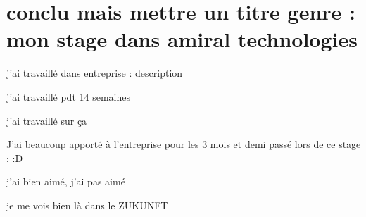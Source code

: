 \section{conclu mais mettre un titre genre : mon stage dans amiral technologies}

j'ai travaillé dans entreprise : description

j'ai travaillé pdt 14 semaines

j'ai travaillé sur ça

J'ai beaucoup apporté à l'entreprise pour les 3 mois et demi passé lors de ce stage : :D

j'ai bien aimé, j'ai pas aimé

je me vois bien là dans le ZUKUNFT

